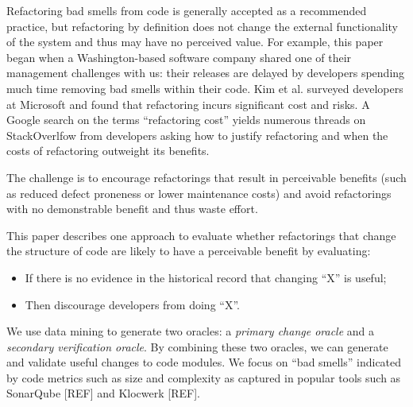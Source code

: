\documentclass[twocolumn,5p]{elsarticle}
\newcommand{\bi}{\begin{itemize}[leftmargin=0.4cm]}
\newcommand{\ei}{\end{itemize}}
\theoremstyle{break}
\begin{document}
	Refactoring bad smells from code is generally accepted as a recommended practice, but refactoring by definition does not change the external functionality of the system and thus may have no perceived value. For example, this paper began when a Washington-based software company shared one of their management challenges with us: their  releases are delayed by developers spending  much time removing bad smells within their code. 
	Kim et al.\cite{kim2012field} surveyed developers at Microsoft and found that refactoring incurs significant cost and risks. A Google search on the terms ``refactoring cost'' yields numerous threads on StackOverlfow from developers asking how to justify refactoring and when the costs of refactoring outweight its benefits. 
	
	
	
	
	The challenge is to encourage refactorings that result in perceivable benefits (such as reduced defect proneness or lower maintenance costs) and avoid refactorings with no demonstrable benefit and thus waste effort.
	
	This paper describes one approach to evaluate whether refactorings that change the structure of code are likely to have a perceivable benefit by evaluating:
	\bi
	\item If there is no evidence in the historical record that changing ``X'' is useful;
	\item Then discourage developers from doing ``X''.
	\ei
	We use data mining to generate two oracles: a {\em primary
		change oracle} and a {\em secondary verification oracle}.
	By combining these two oracles,
	we can generate and validate useful
	changes to code modules. We focus on ``bad smells'' indicated by code metrics such as size and complexity as captured in popular tools such as SonarQube [REF] and Klocwerk [REF].
	
\end{document}
